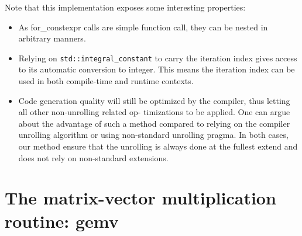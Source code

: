 \documentclass[../../main.tex]{subfiles}
\begin{document}
Note that this implementation exposes some interesting
properties:

\begin{itemize}
\item As for_constexpr calls are simple function call, they
can be nested in arbitrary manners.

\item Relying on \lstinline{std::integral_constant} to carry the
iteration index gives access to its automatic conversion
to integer. This means the iteration index can be used in
both compile-time and runtime contexts.

\item Code generation quality will still be optimized by the
compiler, thus letting all other non-unrolling related op-
timizations to be applied.
One can argue about the advantage of such a method
compared to relying on the compiler unrolling algorithm
or using non-standard unrolling pragma. In both cases, our
method ensure that the unrolling is always done at the fullest
extend and does not rely on non-standard extensions.
\end{itemize}

\section{The matrix-vector multiplication routine: gemv}
\end{document}
